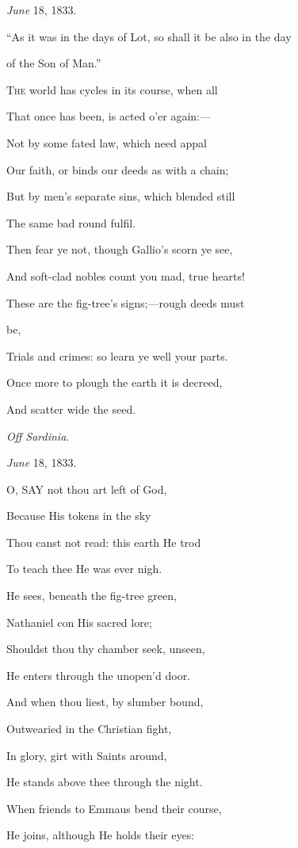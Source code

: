 \emph{June} 18, 1833.


``As it was in the days of Lot, so shall it
be also in the day

of the Son of Man.''

T\textsc{he} world has cycles in its course, when all

That once has been, is acted o'er again:—

Not by some fated law, which need appal

Our faith, or binds our deeds as with a chain;

But by men's separate sins, which blended still

The same bad round fulfil.

Then fear ye not, though Gallio's scorn ye see,

And soft-clad nobles count you mad, true hearts!

These are the fig-tree's signs;—rough deeds must

be,

Trials and crimes: so learn ye well your parts.

Once more to plough the earth it is decreed,

And
scatter wide the seed.

\emph{Off Sardinia}.

\emph{June} 18, 1833.


O, SAY not thou art left of God,

Because His tokens in the sky

Thou canst not read: this earth He trod

To teach thee He was ever nigh.

He sees, beneath the fig-tree green,

Nathaniel con His sacred lore;

Shouldst thou thy chamber seek, unseen,

He enters through the unopen'd door.

And when thou liest, by slumber bound,

Outwearied in the Christian fight,

In glory, girt with Saints around,

He stands above thee through the night.

When friends to Emmaus bend their course,

He joins, although He holds their eyes:

